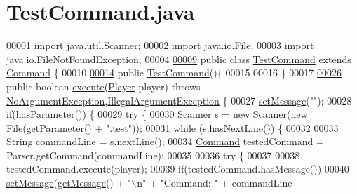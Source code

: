 \hypertarget{TestCommand_8java_source}{\section{Test\-Command.\-java}
}

\begin{DoxyCode}
00001 \textcolor{keyword}{import} java.util.Scanner;
00002 \textcolor{keyword}{import} java.io.File;
00003 \textcolor{keyword}{import} java.io.FileNotFoundException;
00004 
\hypertarget{TestCommand_8java_source_l00009}{}\hyperlink{classTestCommand}{00009} \textcolor{keyword}{public} \textcolor{keyword}{class }\hyperlink{classTestCommand}{TestCommand} \textcolor{keyword}{extends} \hyperlink{classCommand}{Command} \{
00010 
\hypertarget{TestCommand_8java_source_l00014}{}\hyperlink{classTestCommand_a562eaa3c455e0be709b1caa02c9044e6}{00014}     \textcolor{keyword}{public} \hyperlink{classTestCommand_a562eaa3c455e0be709b1caa02c9044e6}{TestCommand}()\{
00015 
00016     \}
00017 
\hypertarget{TestCommand_8java_source_l00026}{}\hyperlink{classTestCommand_a2c5d98451d5cedb9297caae17378de63}{00026}     \textcolor{keyword}{public} \textcolor{keywordtype}{boolean} \hyperlink{classTestCommand_a2c5d98451d5cedb9297caae17378de63}{execute}(\hyperlink{classPlayer}{Player} player) \textcolor{keywordflow}{throws} 
      \hyperlink{classNoArgumentException}{NoArgumentException},\hyperlink{classIllegalArgumentException}{IllegalArgumentException} \{
00027         \hyperlink{classCommand_a715709d8f0ab65879d79ad1725c96f17}{setMessage}(\textcolor{stringliteral}{""});
00028         \textcolor{keywordflow}{if}(\hyperlink{classCommand_a9b042558156d6749566e0fd9d48d3bfe}{hasParameter}()) \{
00029             \textcolor{keywordflow}{try} \{
00030                 Scanner s = \textcolor{keyword}{new} Scanner(\textcolor{keyword}{new} File(\hyperlink{classCommand_a1ced3739d546770ba1389e6ce228255e}{getParameter}() + \textcolor{stringliteral}{".test"}));
00031                 \textcolor{keywordflow}{while} (s.hasNextLine()) \{
00032 
00033                     String commandLine = s.nextLine();
00034                     \hyperlink{classCommand}{Command} testedCommand = Parser.getCommand(commandLine);
00035 
00036                     \textcolor{keywordflow}{try} \{
00037 
00038                         testedCommand.execute(player);
00039                         \textcolor{keywordflow}{if}(testedCommand.hasMessage())
00040                             \hyperlink{classCommand_a715709d8f0ab65879d79ad1725c96f17}{setMessage}(\hyperlink{classCommand_ac3d4abebefb2aea0ce9757bf9c356882}{getMessage}() + \textcolor{stringliteral}{"\(\backslash\)n"} + \textcolor{stringliteral}{"Command: "} + commandLine 

\end{DoxyCode}
